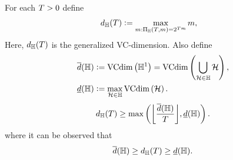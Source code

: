 \begin{definition}
For each $T > 0$ define
\begin{align}
    d_{\mathbb{H}}(T) &\vcentcolon= \max_{m: \Pi_{\mathbb{H}}(T, m) = 2^{T m}} m , \nonumber 
\end{align}
Here, $d_{\mathbb{H}}(T)$ is the generalized VC-dimension.
Also define
\begin{align}
    \overline{d}(\mathbb{H}) &\vcentcolon= \text{VCdim}\left(\mathbb{H}^1\right) = \text{VCdim}\left(\bigcup_{\mathcal{H} \in \mathbb{H}} \mathcal{H}\right)  ,  \nonumber \\
    \underline{d}(\mathbb{H}) &\vcentcolon= \max_{\mathcal{H} \in \mathbb{H}} \text{VCdim}\left(\mathcal{H}\right)  . \nonumber
\end{align}
\begin{equation}
    \nonumber
    d_\hypspacef(\ntasks) \geq \max\left(\floor*{\frac{\overline{d}(\hypspacef)}{\ntasks}}, \underline{d}(\hypspacef) \right) .
\end{equation}
where it can be observed that 
\begin{equation}
    \label{eq:genvc_inequalities}
    \overline{d}(\hypspacef) \geq  d_\hypspacef(\ntasks)\geq \underline{d}(\hypspacef).
\end{equation}

\end{definition}
